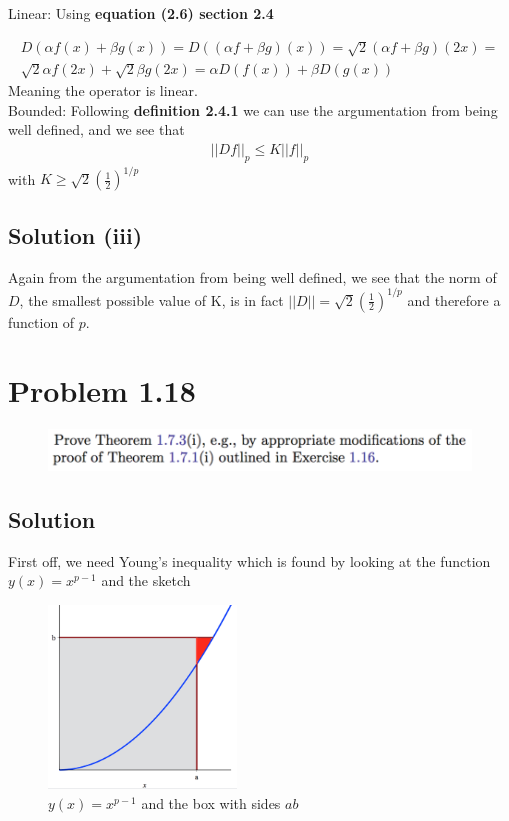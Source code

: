 \documentclass{article}
\begin{document}
Linear: Using \textbf{equation (2.6) section 2.4}

\begin{gather*}
    D(\alpha f(x) + \beta g(x))=D((\alpha f + \beta g)(x)) = \sqrt{2}(\alpha f + \beta g)(2x)= \\ 
    \sqrt{2}\alpha f(2x) + \sqrt{2}\beta g(2x) = \alpha D(f(x)) + \beta D(g(x))
\end{gather*}
Meaning the operator is linear. \\

Bounded: Following \textbf{definition 2.4.1} we can use the argumentation from being well defined, and we see that \begin{gather*}
    ||Df||_p \leq K ||f||_p
\end{gather*}
with $K\geq \sqrt{2}\left(\frac{1}{2}\right)^{1/p}$

\subsection*{Solution (iii)}

Again from the argumentation from being well defined, we see that the norm of $D$, the smallest possible value of K, is in fact $||D||=\sqrt{2}\left(\frac{1}{2}\right)^{1/p}$ and therefore a function of $p$. 

\section*{Problem 1.18}
\begin{figure}[H]
    \centering
    \includegraphics[width=\textwidth]{fig/prob118}
\end{figure}

\subsection*{Solution}
First off, we need Young's inequality which is found by looking at the function $y(x)=x^{p-1}$ and the sketch

\begin{figure}[H]
    \centering
    \includegraphics[width=5cm]{fig/sketch}
    \caption*{$y(x)=x^{p-1}$ and the box with sides $ab$}
\end{figure}
\end{document}

